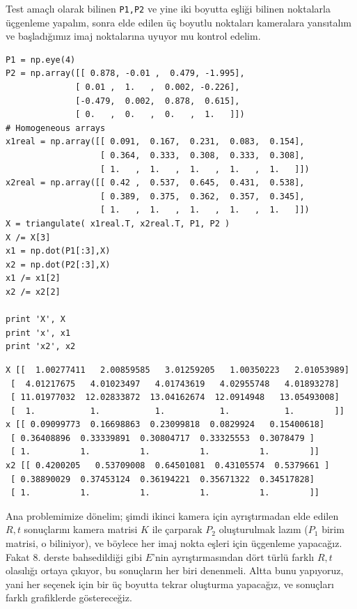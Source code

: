 \documentclass[12pt,fleqn]{article}\usepackage{../../common}
\begin{document}
Test amaçlı olarak bilinen \verb!P1,P2! ve yine iki boyutta eşliği bilinen
noktalarla üçgenleme yapalım, sonra elde edilen üç boyutlu noktaları
kameralara yansıtalım ve başladığımız imaj noktalarına uyuyor mu kontrol
edelim.

\begin{verbatim}
P1 = np.eye(4)
P2 = np.array([[ 0.878, -0.01 ,  0.479, -1.995],
              [ 0.01 ,  1.   ,  0.002, -0.226],
              [-0.479,  0.002,  0.878,  0.615],
              [ 0.   ,  0.   ,  0.   ,  1.   ]])
# Homogeneous arrays
x1real = np.array([[ 0.091,  0.167,  0.231,  0.083,  0.154],
                   [ 0.364,  0.333,  0.308,  0.333,  0.308],
                   [ 1.   ,  1.   ,  1.   ,  1.   ,  1.   ]])
x2real = np.array([[ 0.42 ,  0.537,  0.645,  0.431,  0.538],
                   [ 0.389,  0.375,  0.362,  0.357,  0.345],
                   [ 1.   ,  1.   ,  1.   ,  1.   ,  1.   ]])
X = triangulate( x1real.T, x2real.T, P1, P2 )
X /= X[3]
x1 = np.dot(P1[:3],X)
x2 = np.dot(P2[:3],X)
x1 /= x1[2]
x2 /= x2[2]
 
print 'X', X
print 'x', x1
print 'x2', x2
\end{verbatim}

\begin{verbatim}
X [[  1.00277411   2.00859585   3.01259205   1.00350223   2.01053989]
 [  4.01217675   4.01023497   4.01743619   4.02955748   4.01893278]
 [ 11.01977032  12.02833872  13.04162674  12.0914948   13.05493008]
 [  1.           1.           1.           1.           1.        ]]
x [[ 0.09099773  0.16698863  0.23099818  0.0829924   0.15400618]
 [ 0.36408896  0.33339891  0.30804717  0.33325553  0.3078479 ]
 [ 1.          1.          1.          1.          1.        ]]
x2 [[ 0.4200205   0.53709008  0.64501081  0.43105574  0.5379661 ]
 [ 0.38890029  0.37453124  0.36194221  0.35671322  0.34517828]
 [ 1.          1.          1.          1.          1.        ]]
\end{verbatim}

Ana problemimize dönelim; şimdi ikinci kamera için ayrıştırmadan elde
edilen $R,t$ sonuçlarını kamera matrisi $K$ ile çarparak $P_2$ oluşturulmak
lazım ($P_1$ birim matrisi, o biliniyor), ve böylece her imaj nokta eşleri
için üçgenleme yapacağız. Fakat 8. derste bahsedildiği gibi $E$'nin
ayrıştırmasından dört türlü farklı $R,t$ olasılığı ortaya çıkıyor, bu
sonuçların her biri denenmeli. Altta bunu yapıyoruz, yani her seçenek için
bir üç boyutta tekrar oluşturma yapacağız, ve sonuçları farklı grafiklerde
göstereceğiz.
\end{document}
